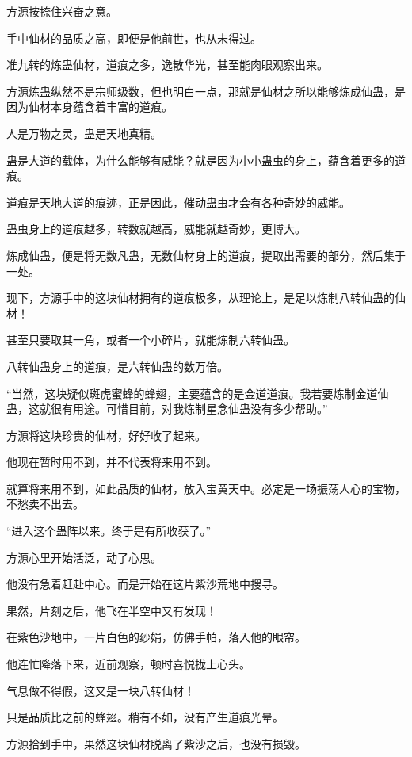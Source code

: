 
\begin{this_body}

方源按捺住兴奋之意。

手中仙材的品质之高，即便是他前世，也从未得过。

准九转的炼蛊仙材，道痕之多，逸散华光，甚至能肉眼观察出来。

方源炼蛊纵然不是宗师级数，但也明白一点，那就是仙材之所以能够炼成仙蛊，是因为仙材本身蕴含着丰富的道痕。

人是万物之灵，蛊是天地真精。

蛊是大道的载体，为什么能够有威能？就是因为小小蛊虫的身上，蕴含着更多的道痕。

道痕是天地大道的痕迹，正是因此，催动蛊虫才会有各种奇妙的威能。

蛊虫身上的道痕越多，转数就越高，威能就越奇妙，更博大。

炼成仙蛊，便是将无数凡蛊，无数仙材身上的道痕，提取出需要的部分，然后集于一处。

现下，方源手中的这块仙材拥有的道痕极多，从理论上，是足以炼制八转仙蛊的仙材！

甚至只要取其一角，或者一个小碎片，就能炼制六转仙蛊。

八转仙蛊身上的道痕，是六转仙蛊的数万倍。

“当然，这块疑似斑虎蜜蜂的蜂翅，主要蕴含的是金道道痕。我若要炼制金道仙蛊，这就很有用途。可惜目前，对我炼制星念仙蛊没有多少帮助。”

方源将这块珍贵的仙材，好好收了起来。

他现在暂时用不到，并不代表将来用不到。

就算将来用不到，如此品质的仙材，放入宝黄天中。必定是一场振荡人心的宝物，不愁卖不出去。

“进入这个蛊阵以来。终于是有所收获了。”

方源心里开始活泛，动了心思。

他没有急着赶赴中心。而是开始在这片紫沙荒地中搜寻。

果然，片刻之后，他飞在半空中又有发现！

在紫色沙地中，一片白色的纱娟，仿佛手帕，落入他的眼帘。

他连忙降落下来，近前观察，顿时喜悦拢上心头。

气息做不得假，这又是一块八转仙材！

只是品质比之前的蜂翅。稍有不如，没有产生道痕光晕。

方源拾到手中，果然这块仙材脱离了紫沙之后，也没有损毁。


\end{this_body}
